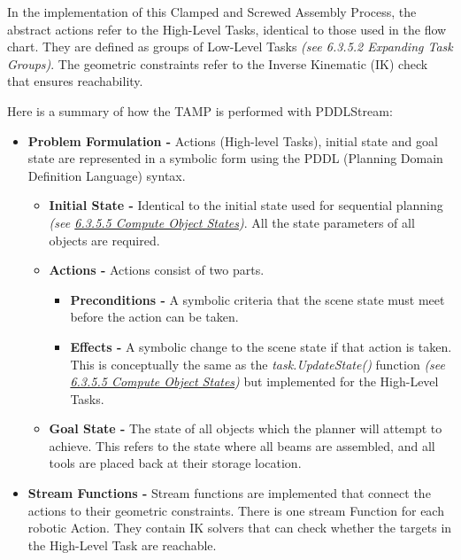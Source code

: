 \documentclass[11pt]{book}
\begin{document}
In the implementation of this Clamped and Screwed Assembly Process, the abstract actions refer to the High-Level Tasks, identical to those used in the flow chart. They are defined as groups of Low-Level Tasks \textit{(see 6.3.5.2 Expanding Task Groups)}. The geometric constraints refer to the Inverse Kinematic (IK) check that ensures reachability. 

Here is a summary of how the TAMP is performed with PDDLStream:

\begin{itemize}
	\item \textbf{Problem Formulation - }Actions (High-level Tasks), initial state and goal state are represented in a symbolic form using the PDDL (Planning Domain Definition Language) syntax.

\begin{itemize}
	\item \textbf{Initial State - }Identical to the initial state used for sequential planning \textit{(see \uline{6.3.5.5 Compute Object States})}. All the state parameters of all objects are required.

	\item \textbf{Actions - }Actions consist of two parts. 

\begin{itemize}
	\item \textbf{Preconditions - }A symbolic criteria that the scene state must meet before the action can be taken. 

	\item \textbf{Effects - }A symbolic change to the scene state if that action is taken. This is conceptually the same as the \textit{task.UpdateState()} function \textit{(see \uline{6.3.5.5 Compute Object States})} but implemented for the High-Level Tasks.

\end{itemize}
	\item \textbf{Goal State - }The state of all objects which the planner will attempt to achieve. This refers to the state where all beams are assembled, and all tools are placed back at their storage location.

\end{itemize}
	\item \textbf{Stream Functions - }Stream functions are implemented that connect the actions to their geometric constraints. There is one stream Function for each robotic Action. They contain IK solvers that can check whether the targets in the High-Level Task are reachable.


\end{itemize}
\end{document}
